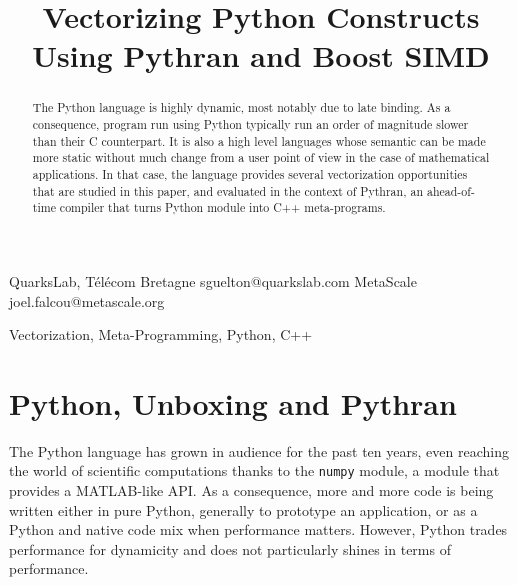 \documentclass[preprint]{sigplanconf}
\begin{document}
\setlength{\pdfpageheight}{\paperheight}
\setlength{\pdfpagewidth}{\paperwidth}


\title{Vectorizing Python Constructs Using Pythran and Boost SIMD}

           {QuarksLab, T{\'e}l{\'e}com Bretagne}
           {sguelton@quarkslab.com}
           {MetaScale}
           {joel.falcou@metascale.org}

\maketitle

\begin{abstract}

    The Python language is highly dynamic, most notably due to late binding. As
    a consequence, program run using Python typically run an order of magnitude
    slower than their C counterpart. It is also a high level languages whose
    semantic can be made more static without much change from a user point of
    view in the case of mathematical applications. In that case, the language
    provides several vectorization opportunities that are studied in this
    paper, and evaluated in the context of Pythran, an ahead-of-time compiler
    that turns Python module into C++ meta-programs.

\end{abstract}



\keywords
Vectorization, Meta-Programming, Python, C++


\section{Python, Unboxing and Pythran}

The Python language has grown in audience for the past ten years, even reaching
the world of scientific computations thanks to the \texttt{numpy} module, a
module that provides a MATLAB-like API. As a consequence, more and more code is
being written either in pure Python, generally to prototype an application, or
as a Python and native code mix when performance matters. However, Python
trades performance for dynamicity and does not particularly shines in terms of
performance.
\end{document}
